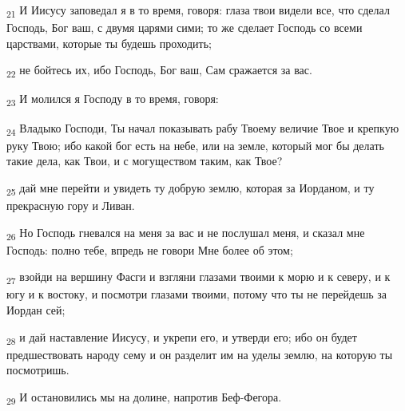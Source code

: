 \begin{tcolorbox}
\textsubscript{21} И Иисусу заповедал я в то время, говоря: глаза твои видели все, что сделал Господь, Бог ваш, с двумя царями сими; то же сделает Господь со всеми царствами, которые ты будешь проходить;
\end{tcolorbox}
\begin{tcolorbox}
\textsubscript{22} не бойтесь их, ибо Господь, Бог ваш, Сам сражается за вас.
\end{tcolorbox}
\begin{tcolorbox}
\textsubscript{23} И молился я Господу в то время, говоря:
\end{tcolorbox}
\begin{tcolorbox}
\textsubscript{24} Владыко Господи, Ты начал показывать рабу Твоему величие Твое и крепкую руку Твою; ибо какой бог есть на небе, или на земле, который мог бы делать такие дела, как Твои, и с могуществом таким, как Твое?
\end{tcolorbox}
\begin{tcolorbox}
\textsubscript{25} дай мне перейти и увидеть ту добрую землю, которая за Иорданом, и ту прекрасную гору и Ливан.
\end{tcolorbox}
\begin{tcolorbox}
\textsubscript{26} Но Господь гневался на меня за вас и не послушал меня, и сказал мне Господь: полно тебе, впредь не говори Мне более об этом;
\end{tcolorbox}
\begin{tcolorbox}
\textsubscript{27} взойди на вершину Фасги и взгляни глазами твоими к морю и к северу, и к югу и к востоку, и посмотри глазами твоими, потому что ты не перейдешь за Иордан сей;
\end{tcolorbox}
\begin{tcolorbox}
\textsubscript{28} и дай наставление Иисусу, и укрепи его, и утверди его; ибо он будет предшествовать народу сему и он разделит им на уделы землю, на которую ты посмотришь.
\end{tcolorbox}
\begin{tcolorbox}
\textsubscript{29} И остановились мы на долине, напротив Беф-Фегора.
\end{tcolorbox}
